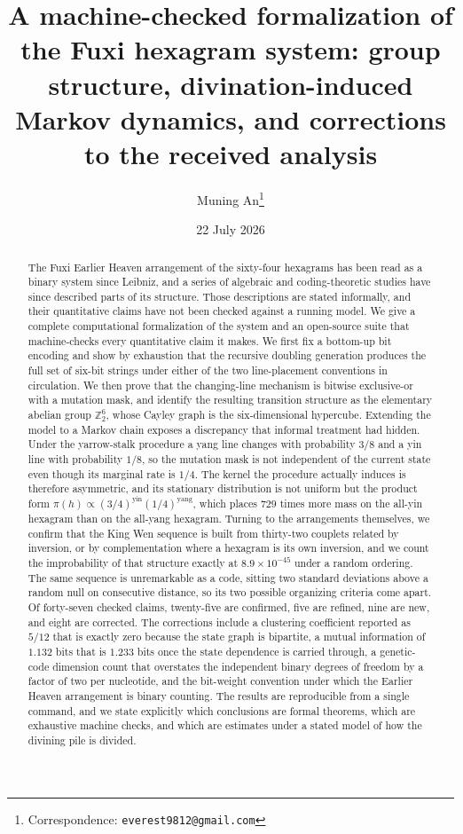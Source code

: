 \documentclass[11pt,a4paper]{article}
\title{A machine-checked formalization of the Fuxi hexagram system:
group structure, divination-induced Markov dynamics,
and corrections to the received analysis}
\author{Muning An\thanks{Correspondence: \texttt{everest9812@gmail.com}}}
\date{22 July 2026}
\newcommand{\Ztwo}{\mathbb{Z}_2}
\begin{document}
\maketitle

\begin{abstract}
The Fuxi Earlier Heaven arrangement of the sixty-four hexagrams has been read as
a binary system since Leibniz, and a series of algebraic and coding-theoretic
studies have since described parts of its structure. Those descriptions are
stated informally, and their quantitative claims have not been checked against a
running model. We give a complete computational formalization of the system and
an open-source suite that machine-checks every quantitative claim it makes. We
first fix a bottom-up bit encoding and show by exhaustion that the recursive
doubling generation produces the full set of six-bit strings under either of the
two line-placement conventions in circulation. We then prove that the
changing-line mechanism is bitwise exclusive-or with a mutation mask, and
identify the resulting transition structure as the elementary abelian group
$\Ztwo^6$, whose Cayley graph is the six-dimensional hypercube. Extending the
model to a Markov chain exposes a discrepancy that informal treatment had
hidden. Under the yarrow-stalk procedure a yang line changes with probability
$3/8$ and a yin line with probability $1/8$, so the mutation mask is not
independent of the current state even though its marginal rate is $1/4$. The
kernel the procedure actually induces is therefore asymmetric, and its
stationary distribution is not uniform but the product form
$\pi(h) \propto (3/4)^{\text{yin}}(1/4)^{\text{yang}}$, which places $729$ times
more mass on the all-yin hexagram than on the all-yang hexagram. Turning to the
arrangements themselves, we confirm that the King Wen sequence is built from
thirty-two couplets related by inversion, or by complementation where a hexagram
is its own inversion, and we count the improbability of that structure exactly
at $8.9 \times 10^{-45}$ under a random ordering. The same sequence is
unremarkable as a code, sitting two standard deviations above a random null on
consecutive distance, so its two possible organizing criteria come apart. Of
forty-seven checked claims, twenty-five are confirmed, five are refined, nine
are new, and eight are corrected. The corrections include a clustering
coefficient reported as $5/12$ that is exactly zero because the state graph is
bipartite, a mutual information of $1.132$ bits that is $1.233$ bits once the
state dependence is carried through, a genetic-code dimension count that
overstates the independent binary degrees of freedom by a factor of two per
nucleotide, and the bit-weight convention under which the Earlier Heaven
arrangement is binary counting. The results are reproducible from a single
command, and we state explicitly which conclusions are formal theorems, which
are exhaustive machine checks, and which are estimates under a stated model of
how the divining pile is divided.
\end{abstract}
\end{document}
